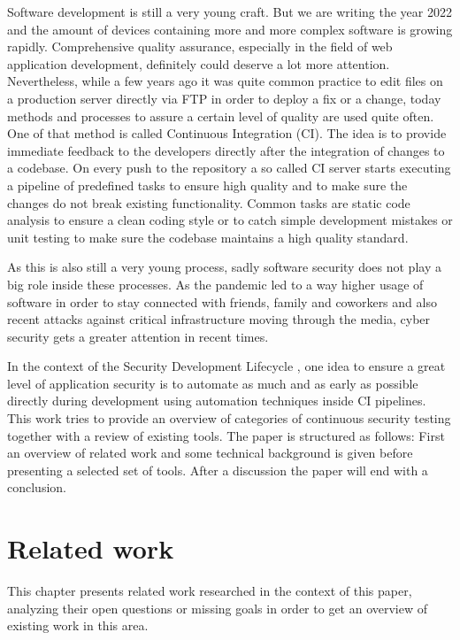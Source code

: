 \documentclass[conference]{IEEEtran}
\begin{document}
Software development is still a very young craft. But we are writing the year 2022 and the amount of devices containing more and more complex software is growing rapidly. Comprehensive quality assurance, especially in the field of web application development, definitely could deserve a lot more attention. Nevertheless, while a few years ago it was quite common practice to edit files on a production server directly via FTP in order to deploy a fix or a change, today methods and processes to assure a certain level of quality are used quite often. One of that method is called Continuous Integration (CI). The idea is to provide immediate feedback to the developers directly after the integration of changes to a codebase. On every push to the repository a so called CI server starts executing a pipeline of predefined tasks to ensure high quality and to make sure the changes do not break existing functionality. Common tasks are static code analysis to ensure a clean coding style or to catch simple development mistakes or unit testing to make sure the codebase maintains a high quality standard.

As this is also still a very young process, sadly software security does not play a big role inside these processes. As the pandemic led to a way higher usage of software in order to stay connected with friends, family and coworkers and also recent attacks against critical infrastructure moving through the media, cyber security gets a greater attention in recent times.

In the context of the Security Development Lifecycle \cite{sdl}, one idea to ensure a great level of application security is to automate as much and as early as possible directly during development using automation techniques inside CI pipelines. This work tries to provide an overview of categories of continuous security testing together with a review of existing tools. The paper is structured as follows: First an overview of related work and some technical background is given before presenting a selected set of tools. After a discussion the paper will end with a conclusion.

\section{Related work}

This chapter presents related work researched in the context of this paper, analyzing their open questions or missing goals in order to get an overview of existing work in this area.\\
\end{document}
